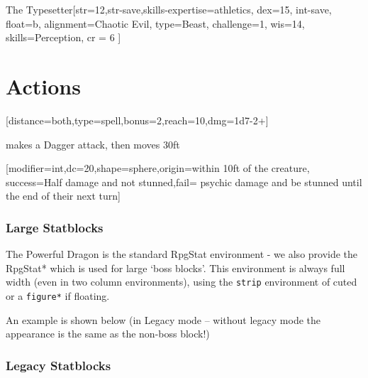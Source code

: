 \documentclass[theme=dnd,size=10pt,columns=2,justified]{rpgbook}
\begin{document}
			\RpgStatLegacyMode{}
			\begin{RpgStat*}{The Typesetter}[str=12,str-save,skills-expertise={athletics},
					dex=15,
					int-save,
					float=b,
					alignment=Chaotic Evil,
					type=Beast,
					challenge=1,
					wis=14,
					skills={Perception},
					cr = 6
				]

				\begin{RpgStatSpells}[title={Dread Spellcasting},innate,modifier=wis,bonus=10]
				\end{RpgStatSpells}

				\section{Actions}


					[distance=both,type=spell,bonus=2,reach=10,dmg=1d7-2+]





					\RpgStatLegendarySection
					 \name{} makes a Dagger attack, then moves 30ft

					\RpgStatMythicSection[narration={
								Just when you thought you were safe, a voice rings out \textit{but will it work on Overleaf?}. You realise your work here is far from done...
							}]
					[modifier=int,dc=20,shape=sphere,origin={within 10ft of the creature}, success={Half damage and not stunned},fail={ psychic damage and be stunned until the end of their next turn}]
			\end{RpgStat*}

			\subsubsection{Large Statblocks}

				The Powerful Dragon is the standard RpgStat environment - we also provide the RpgStat* which is used for large `boss blocks'. This environment is always full width (even in two column environments), using the \texttt{strip} environment of cuted or a \texttt{figure*} if floating.

				An example is shown below (in Legacy mode -- without legacy mode the appearance is the same as the non-boss block!)

			\subsubsection{Legacy Statblocks}
\end{document}

